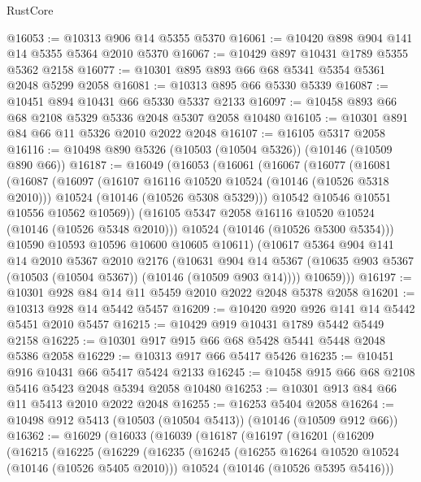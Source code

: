 \begin{lexlean}{RustCore}
\begin{coremodule}
@16053 := @10313 @906 @14 @5355 @5370
@16061 := @10420 @898 @904 @141 @14 @5355 @5364 @2010 @5370
@16067 := @10429 @897 @10431 @1789 @5355 @5362 @2158
@16077 := @10301 @895 @893 @66 @68 @5341 @5354 @5361 @2048 @5299 @2058
@16081 := @10313 @895 @66 @5330 @5339
@16087 := @10451 @894 @10431 @66 @5330 @5337 @2133
@16097 := @10458 @893 @66 @68 @2108 @5329 @5336 @2048 @5307 @2058 @10480
@16105 := @10301 @891 @84 @66 @11 @5326 @2010 @2022 @2048
@16107 := @16105 @5317 @2058
@16116 := @10498 @890 @5326 (@10503 (@10504 @5326)) (@10146 (@10509 @890 @66))
@16187 := @16049
    (@16053
      (@16061
        (@16067
          (@16077
            (@16081
              (@16087
                (@16097
                  (@16107 @16116 @10520 @10524 (@10146 (@10526 @5318 @2010)))
                  @10524
                  (@10146 (@10526 @5308 @5329)))
                @10542
                @10546
                @10551
                @10556
                @10562
                @10569))
            (@16105 @5347 @2058 @16116 @10520 @10524 (@10146 (@10526 @5348 @2010)))
            @10524
            (@10146 (@10526 @5300 @5354)))
          @10590
          @10593
          @10596
          @10600
          @10605
          @10611)
        (@10617
          @5364
          @904
          @141
          @14
          @2010
          @5367
          @2010
          @2176
          (@10631
            @904
            @14
            @5367
            (@10635 @903 @5367 (@10503 (@10504 @5367)) (@10146 (@10509 @903 @14))))
          @10659)))
@16197 := @10301 @928 @84 @14 @11 @5459 @2010 @2022 @2048 @5378 @2058
@16201 := @10313 @928 @14 @5442 @5457
@16209 := @10420 @920 @926 @141 @14 @5442 @5451 @2010 @5457
@16215 := @10429 @919 @10431 @1789 @5442 @5449 @2158
@16225 := @10301 @917 @915 @66 @68 @5428 @5441 @5448 @2048 @5386 @2058
@16229 := @10313 @917 @66 @5417 @5426
@16235 := @10451 @916 @10431 @66 @5417 @5424 @2133
@16245 := @10458 @915 @66 @68 @2108 @5416 @5423 @2048 @5394 @2058 @10480
@16253 := @10301 @913 @84 @66 @11 @5413 @2010 @2022 @2048
@16255 := @16253 @5404 @2058
@16264 := @10498 @912 @5413 (@10503 (@10504 @5413)) (@10146 (@10509 @912 @66))
@16362 := @16029
    (@16033
      (@16039
        (@16187
          (@16197
            (@16201
              (@16209
                (@16215
                  (@16225
                    (@16229
                      (@16235
                        (@16245
                          (@16255 @16264 @10520 @10524 (@10146 (@10526 @5405 @2010)))
                          @10524
                          (@10146 (@10526 @5395 @5416)))

\end{coremodule}
\end{lexlean}
